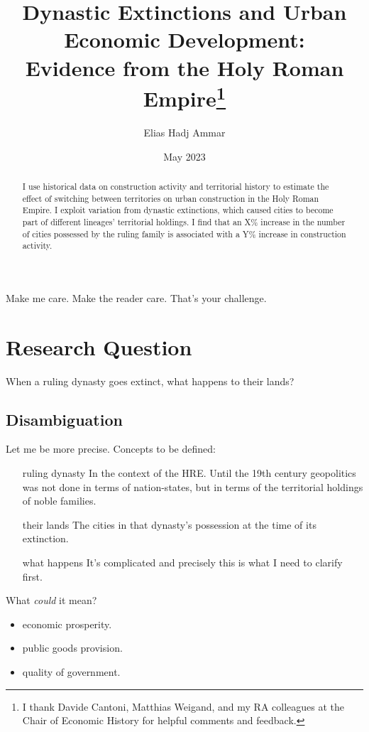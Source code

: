 \documentclass{article}
\title{Dynastic Extinctions and Urban Economic Development: \\Evidence from the Holy Roman Empire\footnote{I thank Davide Cantoni, Matthias Weigand, and my RA colleagues at the Chair of Economic History for helpful comments and feedback.}
}
\author{Elias Hadj Ammar}
\date{May 2023}
\begin{document}
\onehalfspacing
\maketitle
\thispagestyle{empty}

\begin{abstract}
I use historical data on construction activity and territorial history to estimate the effect of switching between territories on urban construction in the Holy Roman Empire. I exploit variation from dynastic extinctions, which caused cities to become part of different lineages' territorial holdings. I find that an X\% increase in the number of cities possessed by the ruling family is associated with a Y\% increase in construction activity.
\end{abstract}




\newpage

\setcounter{page}{1}
\doublespacing

 
Make me care.
Make the reader care. That's your challenge.



\section{Research Question}

When a ruling dynasty goes extinct, what happens to their lands?

\subsection{Disambiguation}
Let me be more precise. Concepts to be defined:
\begin{itemize}
    \item[ruling dynasty] In the context of the HRE. Until the 19th century geopolitics was not done in terms of nation-states, but in terms of the territorial holdings of noble families.
    \item[their lands] The cities in that dynasty's possession at the time of its extinction.
    \item[what happens] It's complicated and precisely this is what I need to clarify first.
\end{itemize}

What \textit{could} it mean?
\begin{itemize}
    \item economic prosperity.
    \item public goods provision.
    \item quality of government.
\end{itemize}
\end{document}
